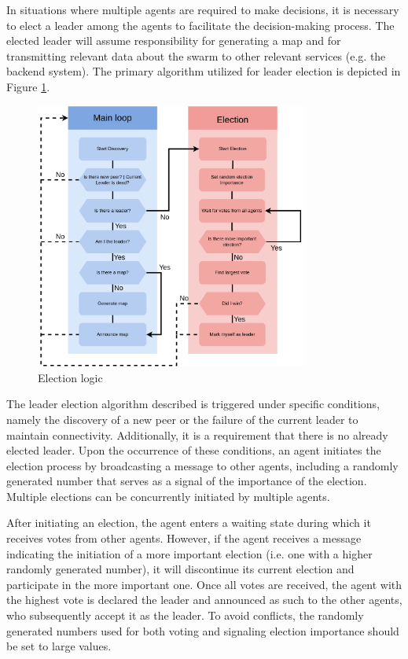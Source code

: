 In situations where multiple agents are required to make decisions, it is necessary to elect a leader among the agents to facilitate the decision-making process. The elected leader will assume responsibility for generating a map and for transmitting relevant data about the swarm to other relevant services (e.g. the backend system). The primary algorithm utilized for leader election is depicted in Figure \ref{fig:election_logic}. 

\begin{figure}[H]
    \centering
    \includegraphics[width=0.8\textwidth]{pictures/election_logic.png}
    \caption{ Election logic}
    \label{fig:election_logic}
\end{figure}

The leader election algorithm described is triggered under specific conditions, namely the discovery of a new peer or the failure of the current leader to maintain connectivity. Additionally, it is a requirement that there is no already elected leader. Upon the occurrence of these conditions, an agent initiates the election process by broadcasting a message to other agents, including a randomly generated number that serves as a signal of the importance of the election. Multiple elections can be concurrently initiated by multiple agents.

After initiating an election, the agent enters a waiting state during which it receives votes from other agents. However, if the agent receives a message indicating the initiation of a more important election (i.e. one with a higher randomly generated number), it will discontinue its current election and participate in the more important one. Once all votes are received, the agent with the highest vote is declared the leader and announced as such to the other agents, who subsequently accept it as the leader. To avoid conflicts, the randomly generated numbers used for both voting and signaling election importance should be set to large values.